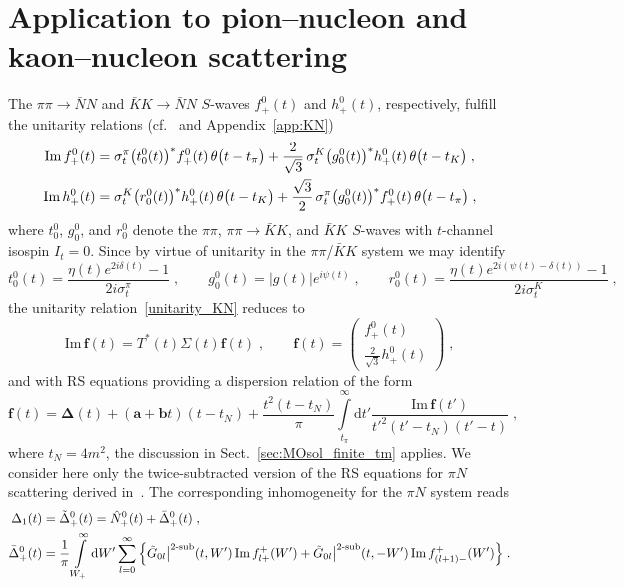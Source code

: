 \documentclass[11pt]{article}%
\providecommand{\ec}{\;,}
\providecommand{\ep}{\;.}
\providecommand{\nt}{\notag}
\newcommand{\diff}{\text{d}}
\newcommand{\tpi}{t_\pi}
\newcommand{\tK}{t_K}
\newcommand{\tN}{t_N}
\newcommand{\ff}{\mathbf{f}}
\newcommand{\beq}{\begin{equation}}
\newcommand{\eeq}{\end{equation}}
\renewcommand{\Im}{\text{Im}\,}
\providecommand{\twosub}[1]{#1\big|^{2\text{-sub}}}%
\begin{document}
\section{Application to pion--nucleon and kaon--nucleon scattering}
\label{sec:pin_appl}

The $\pi\pi\to\bar N N$ and $\bar K K\to\bar N N$ $S$-waves $f^0_+(t)$ and $h^0_+(t)$, respectively, fulfill the unitarity relations (cf.~\cite{RS_DHKM} and Appendix~\ref{app:KN})
\begin{align}
\label{unitarity_KN}
 \Im f^0_+(t)&=\sigma^\pi_t\big(t^0_0(t)\big)^*f^0_+(t)\,\theta\big(t-\tpi\big)
+\frac{2}{\sqrt{3}}\,\sigma^K_t\big(g^0_0(t)\big)^*h_+^0(t)\,\theta\big(t-\tK\big)\ec\nt\\
\Im h^0_+(t)&=\sigma^K_t\big(r^0_0(t)\big)^*h^0_+(t)\,\theta\big(t-\tK\big)
+\frac{\sqrt{3}}{2}\,\sigma^\pi_t\big(g^0_0(t)\big)^*f_+^0(t)\,\theta\big(t-\tpi\big)\ec
\end{align}
where $t^0_0$, $g^0_0$, and $r^0_0$ denote the $\pi\pi$, $\pi\pi\to\bar K K$, and $\bar K K$ $S$-waves with $t$-channel isospin $I_t=0$. Since by virtue of unitarity in the $\pi\pi$/$\bar K K$ system we may identify
\beq
t^0_0(t)=\frac{\eta(t) e^{2i\delta(t)}-1}{2i\sigma_t^\pi}\ec\qquad g^0_0(t)=|g(t)|e^{i\psi(t)}\ec \qquad 
r^0_0(t)=\frac{\eta(t) e^{2i(\psi(t)-\delta(t))}-1}{2i\sigma_t^K}\ec
\eeq
the unitarity relation~\eqref{unitarity_KN} reduces to
\beq
\Im \ff(t)=T^*(t)\Sigma(t)\ff(t)\ec\qquad 
\ff(t)=\begin{pmatrix}
               f^0_+(t)\\
\frac{2}{\sqrt{3}}h^0_+(t)
              \end{pmatrix}\ec
\eeq
and with RS equations providing a dispersion relation of the form
\beq
\label{f_disp_rel}
\ff(t)=\boldsymbol{\Delta}(t)+(\mathbf{a}+\mathbf{b}t)(t-\tN)+\frac{t^2(t-\tN)}{\pi}\int\limits_{\tpi}^\infty\diff t'\frac{\Im\ff(t')}{t'^2(t'-\tN)(t'-t)}\ec
\eeq
where $\tN=4m^2$, the discussion in Sect.~\ref{sec:MOsol_finite_tm} applies. We consider here only the twice-subtracted version of the RS equations for $\pi N$ scattering derived in~\cite{RS_DHKM}. The corresponding inhomogeneity for the $\pi N$ system reads
\begin{align}
\Delta_1(t)&=\tilde\Delta^0_+(t)=\hat N^0_+(t)+\bar\Delta^0_+(t)\ec\nt\\
%
\bar\Delta^0_+(t)&=\frac{1}{\pi}\int\limits^{\infty}_{W_+}\diff W'\sum\limits^\infty_{l=0}
\Big\{\twosub{\tilde G_{0l}}(t,W')\,\Im f^+_{l+}(W')+\twosub{\tilde G_{0l}}(t,-W')\,\Im f^+_{(l+1)-}(W')\Big\}\ep
\end{align}
\end{document}
